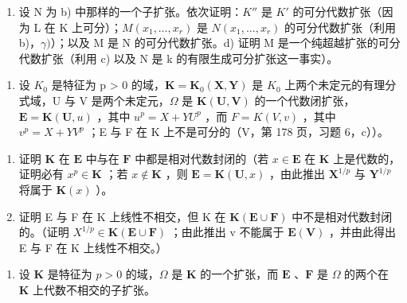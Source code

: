 \begin{enumerate}
\def\labelenumi{\alph{enumi})}
\setcounter{enumi}{2}
\tightlist
\item
  设 N 为 b) 中那样的一个子扩张。依次证明：\(K''\) 是 \(K'\) 的可分代数扩张（因为 L 在 K 上可分）；\(M(x_{1}, \ldots, x_{r})\) 是 \(N(x_{1}, \ldots, x_{r})\) 的可分代数扩张（利用 b)，\(\gamma)\)）；以及 M 是 N 的可分代数扩张。d) 证明 M 是一个纯超越扩张的可分代数扩张（利用 c) 以及 N 是 k 的有限生成可分扩张这一事实）。
\end{enumerate}

\BourbakiExerciseGroup

\begin{enumerate}
\def\labelenumi{\arabic{enumi})}
\tightlist
\item
  设 \(K_{0}\) 是特征为 p \textgreater{} 0 的域，\(\mathbf{K} = \mathbf{K}_{0}(\mathbf{X}, \mathbf{Y})\) 是 \(K_{0}\) 上两个未定元的有理分式域，U 与 V 是两个未定元，\(\Omega\) 是 \(\mathbf{K}(\mathbf{U}, \mathbf{V})\) 的一个代数闭扩张，\(\mathbf{E} = \mathbf{K}(\mathbf{U}, u)\) ，其中 \(u^{p} = X + YU^{p}\) ，而 \(F = K(V, v)\) ，其中 \(v^{p} = X + YV^{p}\) ；E 与 F 在 K 上不是可分的（V，第 178 页，习题 6，c））。
\end{enumerate}

\begin{enumerate}
\def\labelenumi{\alph{enumi})}
\item
  证明 \(\mathbf{K}\) 在 \(\mathbf{E}\) 中与在 \(\mathbf{F}\) 中都是相对代数封闭的（若 \(x \in \mathbf{E}\) 在 \(\mathbf{K}\) 上是代数的，证明必有 \(x^p \in \mathbf{K}\) ；若 \(x \notin \mathbf{K}\) ，则 \(\mathbf{E} = \mathbf{K}(\mathbf{U}, x)\) ，由此推出 \(\mathbf{X}^{1/p}\) 与 \(\mathbf{Y}^{1/p}\) 将属于 \(\mathbf{K}(x)\) ）。
\item
  证明 E 与 F 在 K 上线性不相交，但 K 在 \(\mathbf{K}(\mathbf{E} \cup \mathbf{F})\) 中不是相对代数封闭的。（证明 \(X^{1/p} \in \mathbf{K}(\mathbf{E} \cup \mathbf{F})\) ；由此推出 v 不能属于 \(\mathbf{E}(\mathbf{V})\) ，并由此得出 E 与 F 在 K 上线性不相交。）
\end{enumerate}

\begin{enumerate}
\def\labelenumi{\arabic{enumi})}
\setcounter{enumi}{1}
\tightlist
\item
  设 \(\mathbf{K}\) 是特征为 \(p > 0\) 的域，\(\Omega\) 是 \(\mathbf{K}\) 的一个扩张，而 \(\mathbf{E}\) 、\(\mathbf{F}\) 是 \(\Omega\) 的两个在 \(\mathbf{K}\) 上代数不相交的子扩张。
\end{enumerate}

